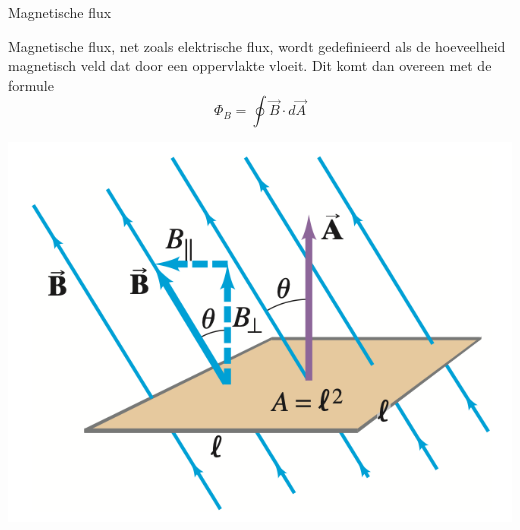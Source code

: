 \begin{theo}{Magnetische flux}
    \vspace{-0.4cm}
    \begin{minipage}{0.77\textwidth}
        Magnetische flux, net zoals elektrische flux, wordt gedefinieerd als de hoeveelheid magnetisch veld dat door een oppervlakte vloeit.
        Dit komt dan overeen met de formule 
        \begin{equation*}
            \Phi_{B} = \oint \Vec{B} \cdot d\Vec{A}
        \end{equation*}
    \end{minipage}
    \begin{minipage}{0.19\textwidth}
        \includegraphics[scale=0.30]{Images/Magnetisme/Faraday.png}
    \end{minipage}
    \vspace{-0.3cm}
\end{theo}
    
\newpage


